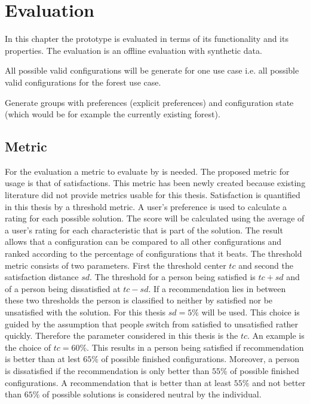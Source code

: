 \chapter{Evaluation}
\label{ch:Evaluation}

In this chapter the prototype is evaluated in terms of its functionality and its properties. The evaluation is an offline evaluation with synthetic data.

All possible valid configurations will be generate for one use case i.e. all possible valid configurations for the forest use case.

Generate groups with preferences (explicit preferences) and configuration state (which would be for example the currently existing forest).

\section{Metric}
\label{sec:Evaluation:Metrics}

For the evaluation a metric to evaluate by is needed. The proposed metric for usage is that of satisfactions. This metric has been newly created because existing literature did not provide metrics usable for this thesis. Satisfaction is quantified in this thesis by a threshold metric. A user's preference is used to calculate a rating for each possible solution. The score will be calculated using the average of a user's rating for each characteristic that is part of the solution. The result allows that a configuration can be compared to all other configurations and ranked according to the percentage of configurations that it beats. The threshold metric consists of two parameters. First the threshold center $tc$ and second the satisfaction distance $sd$. The threshold for a person being satisfied is $tc + sd$ and of a person being dissatisfied at $tc - sd$. If a recommendation lies in between these two thresholds the person is classified to neither by satisfied nor be unsatisfied with the solution. For this thesis  $sd=5\%$ will be used. This choice is guided by the assumption that people switch from satisfied to unsatisfied rather quickly. Therefore the parameter considered in this thesis is the $tc$. An example is the choice of $tc = 60\%$. This results in a person being satisfied if recommendation is better than at lest $65\%$ of possible finished configurations. Moreover, a person is dissatisfied if the recommendation is only better than $55\%$ of possible finished configurations. A recommendation that is better than at least $55\%$ and not better than $65\%$ of possible solutions is considered neutral by the individual.

